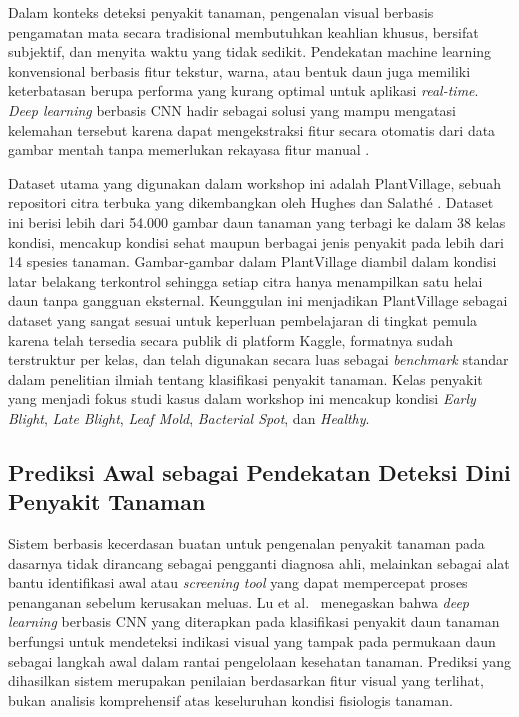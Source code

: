 Dalam konteks deteksi penyakit tanaman, pengenalan visual berbasis pengamatan mata secara tradisional membutuhkan keahlian khusus, bersifat subjektif, dan menyita waktu yang tidak sedikit. Pendekatan machine learning konvensional berbasis fitur tekstur, warna, atau bentuk daun juga memiliki keterbatasan berupa performa yang kurang optimal untuk aplikasi \textit{real-time}. \textit{Deep learning} berbasis CNN hadir sebagai solusi yang mampu mengatasi kelemahan tersebut karena dapat mengekstraksi fitur secara otomatis dari data gambar mentah tanpa memerlukan rekayasa fitur manual \cite{Lu2021}.

Dataset utama yang digunakan dalam workshop ini adalah PlantVillage, sebuah repositori citra terbuka yang dikembangkan oleh Hughes dan Salath\'{e} \cite{Hughes2015}. Dataset ini berisi lebih dari 54.000 gambar daun tanaman yang terbagi ke dalam 38 kelas kondisi, mencakup kondisi sehat maupun berbagai jenis penyakit pada lebih dari 14 spesies tanaman. Gambar-gambar dalam PlantVillage diambil dalam kondisi latar belakang terkontrol sehingga setiap citra hanya menampilkan satu helai daun tanpa gangguan eksternal. Keunggulan ini menjadikan PlantVillage sebagai dataset yang sangat sesuai untuk keperluan pembelajaran di tingkat pemula karena telah tersedia secara publik di platform Kaggle, formatnya sudah terstruktur per kelas, dan telah digunakan secara luas sebagai \textit{benchmark} standar dalam penelitian ilmiah tentang klasifikasi penyakit tanaman. Kelas penyakit yang menjadi fokus studi kasus dalam workshop ini mencakup kondisi \textit{Early Blight}, \textit{Late Blight}, \textit{Leaf Mold}, \textit{Bacterial Spot}, dan \textit{Healthy}.

\subsection{Prediksi Awal sebagai Pendekatan Deteksi Dini Penyakit Tanaman}
Sistem berbasis kecerdasan buatan untuk pengenalan penyakit tanaman pada dasarnya tidak dirancang sebagai pengganti diagnosa ahli, melainkan sebagai alat bantu identifikasi awal atau \textit{screening tool} yang dapat mempercepat proses penanganan sebelum kerusakan meluas. Lu et al.\ \cite{Lu2021} menegaskan bahwa \textit{deep learning} berbasis CNN yang diterapkan pada klasifikasi penyakit daun tanaman berfungsi untuk mendeteksi indikasi visual yang tampak pada permukaan daun sebagai langkah awal dalam rantai pengelolaan kesehatan tanaman. Prediksi yang dihasilkan sistem merupakan penilaian berdasarkan fitur visual yang terlihat, bukan analisis komprehensif atas keseluruhan kondisi fisiologis tanaman.

